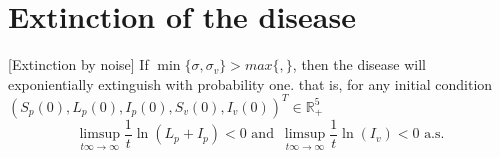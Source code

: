 \section{Extinction of the disease}

\begin{theorem}\label{theorem_noise}[Extinction by noise]
	If $\min\{\sigma,\sigma_v\} > max\{,\}$, then the disease will exponientially extinguish with probability one. that is, for any initial condition $(S_p(0),L_p(0),I_p(0),S_v(0),I_v(0))^T\in \mathbb{R}_+^5$
	\begin{equation*}
		\limsup_{t\infty \rightarrow \infty}\frac{1}{t}\ln(L_p+I_p)< 0\,\, \mbox{and}\,\,\, \limsup_{t\infty \rightarrow \infty}\frac{1}{t}\ln(I_v)< 0\,\,\mbox{a.s.}
	\end{equation*}
\end{theorem}
